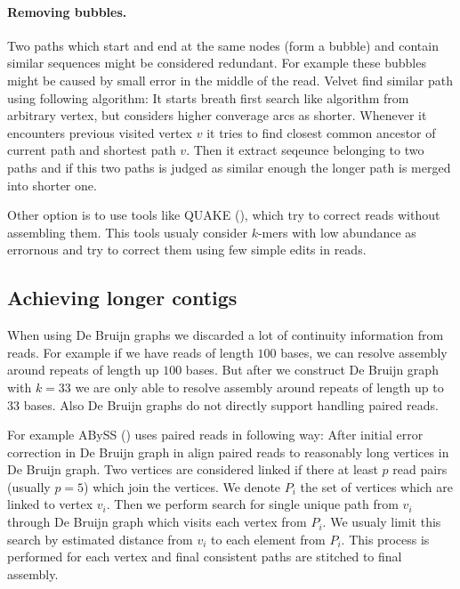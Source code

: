 \paragraph{Removing bubbles.} Two paths which start and end at the same nodes (form a bubble)
and contain similar sequences might be considered redundant.
For example these bubbles might be caused by small error in the middle of the read.
Velvet find similar path using following algorithm:
It starts breath first search like algorithm from arbitrary vertex, but considers higher converage
arcs as shorter. Whenever it encounters previous visited vertex $v$ it tries to find closest common ancestor
of current path and shortest path $v$. Then it extract seqeunce belonging to two paths and if this two
paths is judged as similar enough the longer path is merged into shorter one. 
 
\bigskip

Other option is to use tools like QUAKE (\cite{Quake}), which try to correct reads
without assembling them. This tools usualy consider $k$-mers with low abundance
as errornous and try to correct them using few simple edits in reads.


\subsection{Achieving longer contigs}

When using De Bruijn graphs we discarded a lot of continuity information from reads.
For example if we have reads of length $100$ bases, we can resolve assembly around repeats
of length up $100$ bases. But after we construct De Bruijn graph with $k = 33$ we are only
able to resolve assembly around repeats of length up to $33$ bases. Also De Bruijn graphs
do not directly support handling paired reads.

For example ABySS (\cite{Abyss}) uses paired reads in following way:
After initial error correction in De Bruijn graph in align paired reads
to reasonably long vertices in De Bruijn graph. Two vertices are considered linked
if there at least $p$ read pairs (usually $p=5$) which join the vertices.
We denote $P_i$ the set of vertices which are linked to vertex $v_i$.
Then we perform search for single unique path from $v_i$ through De Bruijn graph which visits
each vertex from $P_i$. We usualy limit this search by estimated distance from $v_i$ to each element
from $P_i$. This process is performed for each vertex and final consistent paths are stitched to final assembly.

